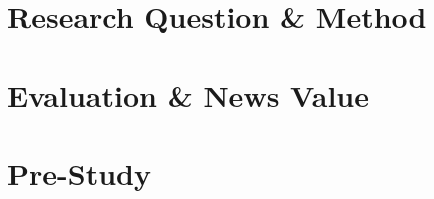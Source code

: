 \documentclass{article}
\begin{document}
\section{Research Question \& Method}
%
%
%
%
%
%
%


\section{Evaluation \& News Value}
%
%


\section{Pre-Study}
%
\end{document}
